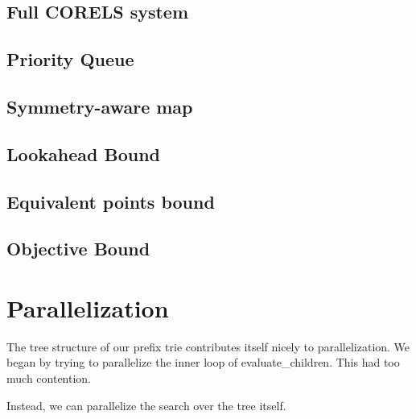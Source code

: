 \subsection{Full CORELS system}

\subsection{Priority Queue}


\subsection{Symmetry-aware map}

\subsection{Lookahead Bound}

\subsection{Equivalent points bound}

\subsection{Objective Bound}

\section{Parallelization}
The tree structure of our prefix trie contributes itself nicely to parallelization.
We began by trying to parallelize the inner loop of evaluate\_children.
This had too much contention.

Instead, we can parallelize the search over the tree itself.